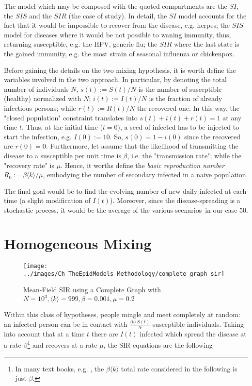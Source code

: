 \documentclass[a4paper,12pt,twoside]{book} %
\theoremstyle{definition}
\begin{document}
The model which may be composed with the quoted compartments are the $SI$, the $SIS$ and the $SIR$ (the case of study). In detail, the $SI$ model accounts for the fact that it would be impossible to recover from the disease, e.g. herpes; the $SIS$ model for diseases where it would be not possible to waning immunity, thus, returning susceptible, e.g. the HPV, generic flu; the $SIR$ where the last state is the gained immunity, e.g. the most strain of seasonal influenza or chickenpox.

Before gaining the details on the two mixing hypothesis, it is worth define the variables involved in the two approach.
In particular, by denoting the total number of individuals $N$, $s(t) := S(t)/N$ is the number of susceptible (healthy) normalized with $N$; $i(t):=I(t)/N$ is the fraction of already infectious persons; while $r(t) := R(t)/N$ the recovered one. In this way, the "closed population" constraint translates into $s(t)+i(t)+r(t)=1$ at any time $t$. 
Thus, at the initial time ($t = 0$), a seed of infected has to be injected to start the infection, e.g. $I(0) := 10$. So, $s(0) = 1 - i(0)$ since the recovered are $r(0) = 0$.
Furthermore, let assume that the likelihood of transmitting the disease to a susceptible per unit time is $\beta$, i.e. the "transmission rate"; while the "recovery rate" is $\mu$. Hence, it worths define the \textit{basic reproduction number}  $R_0 := \beta \langle k \rangle / \mu$, embodying the number of secondary infected in a naive population.

The final goal would be to find the evolving number of new daily infected at each time (a slight modification of $I(t)$). Moreover, since the disease-spreading is a stochastic process, it would be the average of the various scenarios--in our case 50.

\newpage
\section{Homogeneous Mixing}

\begin{figure}[ht]
	\texttt{[image: ../images/Ch\_TheEpidModels\_Methodology/complete\_graph\_sir]}
	\caption{Mean-Field SIR using a Complete Graph with $N = 10^{3}, \langle k \rangle = 999, \beta = 0.001,  \mu = 0.2$}
	\label{fig:MF_SIR}
\end{figure}

Within this class of hypotheses, people mingle and meet completely at random: an infected person can be in contact with {\large $\frac{\langle k \rangle \, S(t)}{N}$} susceptible individuals. Taking into account that at a time $t$ there are $I(t)$ infected which spread the disease at a rate $\beta$\footnote{In many text books, e.g. \cite{Newman:2010_Net:AnIntro}, the $\beta \langle k \rangle$ total rate considered in the following is just $\beta$.} and recovers at a rate $\mu$,
the SIR equations are the following \cite{Newman:2010_Net:AnIntro}
\end{document}
